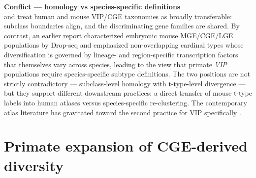 \documentclass[11pt]{article}
\begin{document}
\begin{framed}
\textbf{Conflict --- homology vs species-specific definitions}\\
\citet{Hodge2019} and \citet{Braininitiativecellcensusnetworkbiccn2021}
treat human and mouse VIP/CGE taxonomies as broadly transferable: subclass
boundaries align, and the discriminating gene families are shared. By
contrast, an earlier report characterized embryonic mouse MGE/CGE/LGE
populations by Drop-seq and emphasized non-overlapping cardinal types whose
diversification is governed by lineage- and region-specific transcription
factors that themselves vary across species, leading to the view that primate
\textit{VIP} populations require species-specific subtype definitions. The two
positions are not strictly contradictory --- subclass-level homology with
t-type-level divergence --- but they support different downstream practices: a
direct transfer of mouse t-type labels into human atlases versus
species-specific re-clustering. The contemporary atlas literature has
gravitated toward the second practice for VIP specifically
\citep{Hodge2019, Bakken2021a, Lee2023a, Chartrand2023}.
\end{framed}

\section{Primate expansion of CGE-derived diversity}
\end{document}
